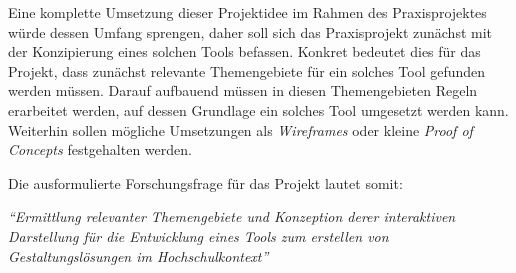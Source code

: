 Eine komplette Umsetzung dieser Projektidee im Rahmen des Praxisprojektes würde dessen Umfang sprengen, daher soll sich das Praxisprojekt zunächst mit der Konzipierung eines solchen Tools befassen. Konkret bedeutet dies für das Projekt, dass zunächst relevante Themengebiete für ein solches Tool gefunden werden müssen. Darauf aufbauend müssen in diesen Themengebieten Regeln erarbeitet werden, auf dessen Grundlage ein solches Tool umgesetzt werden kann. Weiterhin sollen mögliche Umsetzungen als \textit{Wireframes} oder kleine \textit{Proof of Concepts} festgehalten werden.

Die ausformulierte Forschungsfrage für das Projekt lautet somit:

\textit{“Ermittlung relevanter Themengebiete und Konzeption derer interaktiven Darstellung für die Entwicklung eines Tools zum erstellen von Gestaltungslösungen im Hochschulkontext”}



\clearpage
